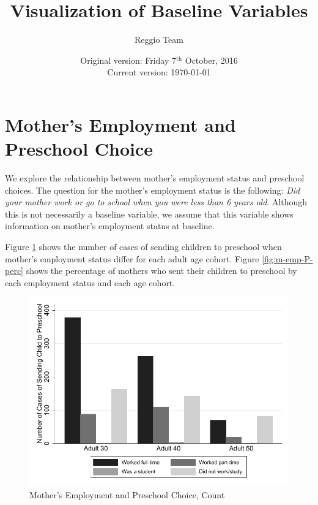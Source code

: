 \documentclass[12pt]{article}
\begin{document}
\title{Visualization of Baseline Variables}
\author{Reggio Team}
\date{Original version: Friday 7$^{\text{th}}$ October, 2016 \\ Current version: \today}
\maketitle

\tableofcontents

\doublespacing

\section{Mother's Employment and Preschool Choice}

We explore the relationship between mother's employment status and preschool choices. The question for the mother's employment status is the following: \textit{Did your mother work or go to school when you were less than 6 years old}. Although this is not necessarily a baseline variable, we assume that this variable shows information on mother's employment status at baseline.

Figure \ref{fig:m-emp-P-count} shows the number of cases of sending children to preschool when mother's employment status differ for each adult age cohort. Figure \ref{fig:m-emp-P-perc} shows the percentage of mothers who sent their children to preschool by each employment status and each age cohort. 

\begin{figure}[H] \caption{Mother's Employment and Preschool Choice, Count} \label{fig:m-emp-P-count}
\centering
\includegraphics[scale=0.9]{../../../../output/image/bar_momworkpreschool_count.pdf}
\end{figure}
\end{document}

